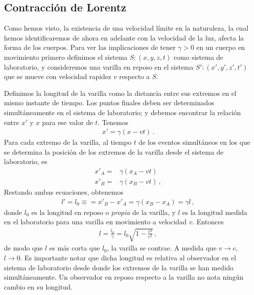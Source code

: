 \subsection{Contracción de Lorentz}
Como hemos visto, la existencia de una velocidad límite en la naturaleza, la cual hemos identificaremos de ahora en adelante con la velocidad de la luz, afecta la forma de los cuerpos. Para ver las implicaciones de tener $\gamma>0$ en un cuerpo en movimiento primero definimos el sistema $S:(x,y,z,t)$ como sistema de laboratorio, y consideremos una varilla en reposo en el sistema $S':(x',y',z',t')$ que se mueve con velocidad rapidez $v$ respecto a $S$. 

Definimos la longitud de la varilla como la distancia entre sus extremos en el mismo instante de tiempo. Los puntos finales deben ser determinados simultáneamente en el sistema de laboratorio; y debemos encontrar la relación entre $x'$ y $x$ para ese valor de $t$. Tenemos
\begin{align*}
  x'=\gamma(x-vt)\,.
\end{align*}
Para cada extremo de la varilla, al tiempo $t$ de los eventos simultáneos en los que se determina la posición de los extremos de la varilla desde el sistema de laboratorio, es
\begin{align*}
  x'_A=&\gamma(x_A-vt)\nonumber\\
  x'_B=&\gamma(x_B-vt)\,,
\end{align*}
Restando ambas ecuaciones, obtenemos
\begin{align*}
  l'=l_0\equiv=x'_B-x'_A=\gamma(x_B-x_A)=\gamma l\,,
\end{align*}
donde $l_0$ es la longitud en reposo o \emph{propia} de la varilla, y $l$ es la longitud medida en el laboratorio para una varilla en movimiento a velocidad $v$. Entonces
\begin{align*}
  l=\frac{l_0}{\gamma}=l_0\sqrt{1-\frac{v^2}{c^2}}\,,
\end{align*}
de modo que $l$ es más corta que $l_0$, la varilla se contrae. A medida que $v\to c$, $l\to 0$. Es importante notar que dicha longitud es relativa al observador en el sistema de laboratorio desde donde los extremos de la varilla se han medido simultáneamente. Un observador en reposo respecto a la varilla no nota ningún cambio en su longitud.
